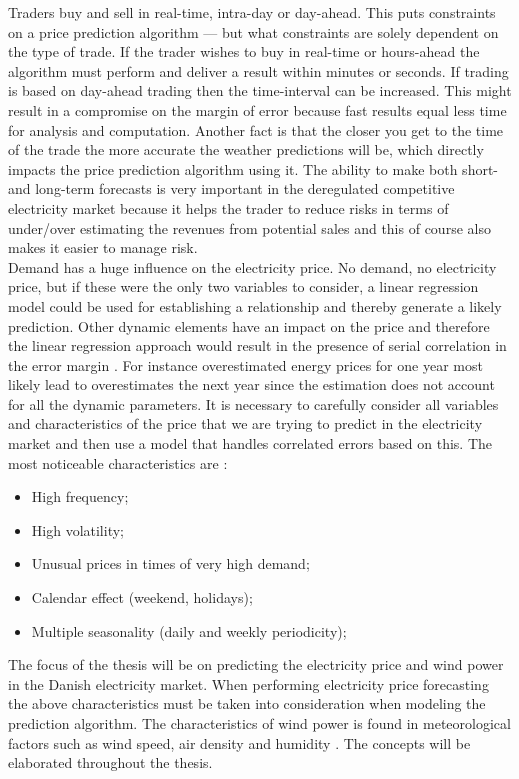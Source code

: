 Traders buy and sell in real-time, intra-day or day-ahead. This puts constraints on a price prediction algorithm --- but what constraints are solely dependent on the type of trade. If the trader wishes to buy in real-time or hours-ahead the algorithm must perform and deliver a result within minutes or seconds. If trading is based on day-ahead trading then the time-interval can be increased. This might result in a compromise on the margin of error because fast results equal less time for analysis and computation. Another fact is that the closer you get to the time of the trade the more accurate the weather predictions will be, which directly impacts the price prediction algorithm using it. The ability to make both short- and long-term forecasts is very important in the deregulated competitive electricity market because it helps the trader to reduce risks in terms of under/over estimating the revenues from potential sales and this of course also makes it easier to manage risk\cite{21}.
\\[0.5cm]
Demand has a huge influence on the electricity price. No demand, no electricity price, but if these were the only two variables to consider, a linear regression model could be used for establishing a relationship and thereby generate a likely prediction. Other dynamic elements have an impact on the price and therefore the linear regression approach would result in the presence of serial correlation in the error margin \cite{21}. For instance overestimated energy prices for one year most likely lead to overestimates the next year since the estimation does not account for all the dynamic parameters. It is necessary to carefully consider all variables and characteristics of the price that we are trying to predict in the electricity market and then use a model that handles correlated errors based on this. The most noticeable characteristics are \cite{21}:
\begin{itemize}
\item High frequency;
\item High volatility;
\item Unusual prices in times of very high demand;
\item Calendar effect (weekend, holidays);
\item Multiple seasonality (daily and weekly periodicity);
\end{itemize}
The focus of the thesis will be on predicting the electricity price and wind power in the Danish electricity market. When performing electricity price forecasting the above characteristics must be taken into consideration when modeling the prediction algorithm. The characteristics of wind power is found in meteorological factors such as wind speed, air density and humidity \cite{WindPowerGenerationUsingANN}. The concepts will be elaborated throughout the thesis.